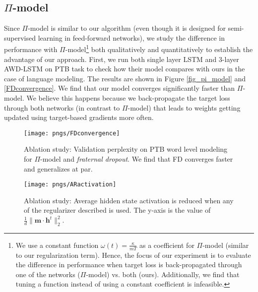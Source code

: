 \documentclass{article} \usepackage{iclr2018_conference,times}
\begin{document}
\subsection{\texorpdfstring{$\Pi$}{TEXT}-model}\label{semisupervised}
Since $\Pi$-model \cite{laine2016temporal} is similar to our algorithm (even though it is designed for semi-supervised learning in feed-forward networks), we study the difference in performance with $\Pi$-model\footnote{We use a constant function $\omega(t) = \frac{\kappa}{mT}$ as a coefficient for $\Pi$-model (similar to our regularization term). Hence, the focus of our experiment is to evaluate the difference in performance when target loss is back-propagated through one of the networks ($\Pi$-model) vs. both (ours). Additionally, we find that tuning a function instead of using a constant coefficient is infeasible.} both qualitatively and quantitatively to establish the advantage of our approach. First, we run both single layer LSTM and 3-layer AWD-LSTM on PTB task to check how their model compares with ours in the case of language modeling. The results are shown in Figure \ref{fig_pi_model} and \ref{FDconvergence}. We find that our model converges significantly faster than $\Pi$-model. We believe this happens because we back-propagate the target loss through both networks (in contrast to $\Pi$-model) that leads to weights getting updated using target-based gradients more often. 

\begin{figure}[t]
\vspace{-0.08cm}
  \centering
  \begin{minipage}[b]{0.48\textwidth}
    \texttt{[image: pngs/FDconvergence]}
    \caption{Ablation study: Validation perplexity on PTB word level modeling for $\Pi$-model and \emph{fraternal dropout}. We find that FD converges faster and generalizes at par.}
    \label{FDconvergence}
  \end{minipage}
  \hfill
  \begin{minipage}[b]{0.48\textwidth}
    \texttt{[image: pngs/ARactivation]}
    \caption{Ablation study: Average hidden state activation is reduced when any of the regularizer described is used. The y-axis is the value of $\frac{1}{d}\lVert\mathbf{m \cdot h}^t\rVert_2^2$.}
    \label{ARactivation}
  \end{minipage}
\vspace{-0.08cm}
\end{figure}
\end{document}

